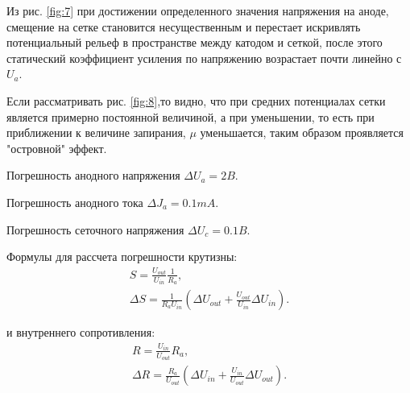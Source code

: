 Из рис. \ref{fig:7} при достижении определенного значения напряжения на аноде,
смещение на сетке становится несущественным и перестает искривлять
потенциальный рельеф в пространстве между катодом и сеткой, после этого
статический коэффициент усиления по напряжению возрастает почти линейно с
$U_a$.

Если рассматривать рис. \ref{fig:8},то видно, что при средних потенциалах сетки
является примерно постоянной величиной, а при уменьшении, то есть при
приближении к величине запирания, $\mu$ уменьшается, таким образом проявляется
"островной" эффект.

Погрешность анодного напряжения $\Delta U_a = 2 B$.

Погрешность анодного тока $\Delta J_a = 0.1 mA$.

Погрешность сеточного напряжения $\Delta U_c = 0.1 B$.

Формулы для рассчета погрешности крутизны:
\begin{gather*}
	S=\frac{U_{out}}{U_{in}} \frac{1}{R_a}, \\
	\Delta S=  \frac{1}{R_a U_{in}}(\Delta U_{out}+\frac{U_{out}}{U_{in}}\Delta U_{in}). 
\end{gather*}

и внутреннего сопротивления:
\begin{gather*}
	R=\frac{U_{in}}{U_{out}} R_a, \\
	\Delta R=  \frac{R_a}{U_{out}}(\Delta U_{in}+\frac{U_{in}}{U_{out}}\Delta U_{out}). 
\end{gather*}


